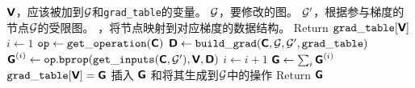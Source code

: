 \begin{algorithm}[ht]
\caption{\gls{BP}算法的内循环子程序${\tt build\_grad}(\TSV, \CalG, \CalG', {\tt grad\_table})$，
由中定义的\gls{BP}算法调用。
}
\label{alg:build_grad}
\begin{algorithmic}
\REQUIRE $\textsf{\textbf{V}}$，应该被加到$\mathcal{G}$和{\tt grad\_table}的变量。
\REQUIRE $\mathcal{G}$，要修改的图。
\REQUIRE $\mathcal{G}'$，根据参与梯度的节点$\mathcal{G}$的受限图。
，将节点映射到对应梯度的数据结构。
 \STATE Return ${\tt grad\_table}[\textsf{\textbf{V}}]$
\ENDIF
\STATE $i \leftarrow 1$
\STATE ${\tt op} \leftarrow {\tt get\_operation}(\textsf{\textbf{C}})$
\STATE $\textsf{\textbf{D}} \leftarrow {\tt build\_grad}(\textsf{\textbf{C}}, \mathcal{G}, \mathcal{G}', {\tt grad\_table})$
\STATE $\textsf{\textbf{G}}^{(i)} \leftarrow {\tt op.bprop}({\tt get\_inputs}(\textsf{\textbf{C}}, \mathcal{G}'), \textsf{\textbf{V}}, \textsf{\textbf{D}})$ 
\STATE $i \leftarrow i + 1$
\ENDFOR
\STATE $\textsf{\textbf{G}} \leftarrow \sum_i \textsf{\textbf{G}}^{(i)}$
\STATE ${\tt grad\_table}[\textsf{\textbf{V}}] = \textsf{\textbf{G}}$
\STATE 插入 $\textsf{\textbf{G}}$ 和将其生成到$\mathcal{G}$中的操作
\STATE Return $\textsf{\textbf{G}}$
\end{algorithmic}
\end{algorithm}


  
